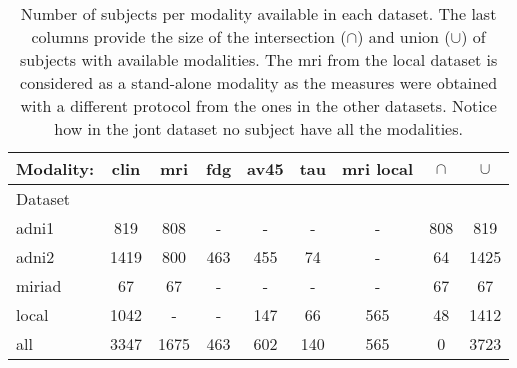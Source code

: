 \begin{table}[!t]
\caption{
Number of subjects per modality available in each dataset.
The last columns provide the size of the intersection ($\cap$) and union ($\cup$) of subjects with available modalities.
The mri from the local dataset is considered as a stand-alone modality as the measures were obtained with a different protocol from the ones in the other datasets.
Notice how in the jont dataset no subject have all the modalities.
}
\centering
\begin{tabular}{lcccccc|cc}
\toprule
Modality: &    clin &   mri &  fdg & av45 &  tau & mri local & $\cap$ & $\cup$ \\
\midrule
Dataset \\
adni1   &   819 &   808 &    - &    - &    - &          - & 808 &  819 \\
adni2   &  1419 &   800 &  463 &  455 &   74 &          - &  64 & 1425 \\
miriad  &    67 &    67 &    - &    - &    - &          - &  67 &   67 \\
local   &  1042 &     - &    - &  147 &   66 &        565 &  48 & 1412 \\
\midrule
all     &  3347 &  1675 &  463 &  602 &  140 &        565 &   0 & 3723 \\
\bottomrule
\end{tabular}
\label{table:datasets}
\end{table}
